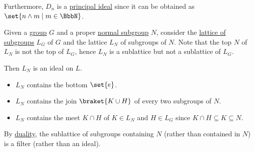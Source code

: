 \begin{example}
\begin{thmenum}
    Furthermore, \( D_n \) is a \hyperref[def:semiring_ideal]{principal ideal} since it can be obtained as \( \set{ n \wedge m \mid m \in \BbbN } \).

     Given a \hyperref[def:group]{group} \( G \) and a proper \hyperref[def:normal_subgroup]{normal subgroup} \( N \), consider the \hyperref[thm:substructures_form_complete_lattice]{lattice of subgroups} \( L_G \) of \( G \) and the lattice \( L_N \) of subgroups of \( N \). Note that the top \( N \) of \( L_N \) is not the top of \( L_G \), hence \( L_N \) is a sublattice but not a  sublattice of \( L_G \).

    Then \( L_N \) is an ideal on \( L \).
    \begin{itemize}
      \item \( L_N \) contains the bottom \( \set{ e } \).
      \item \( L_N \) contains the join \( \braket{ K \cup H } \) of every two subgroups of \( N \).
      \item \( L_N \) contains the meet \( K \cap H \) of \( K \in L_N \) and \( H \in L_G \) since \( K \cap H \subseteq K \subseteq N \).
    \end{itemize}

    By \hyperref[def:semilattice/duality]{duality}, the sublattice of subgroups containing \( N \) (rather than contained in \( N \)) is a filter (rather than an ideal).
  \end{thmenum}
\end{example}

